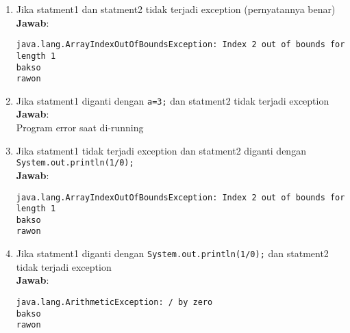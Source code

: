 \documentclass{article}
\newcommand{\jawab}{\textbf{Jawab}:}
\begin{document}
\begin{enumerate}
\begin{enumerate}[label=\alph*.]
      \item Jika statment1 dan statment2 tidak terjadi exception (pernyatannya benar)\\
      \jawab
      \begin{lstlisting}[frame=single]
java.lang.ArrayIndexOutOfBoundsException: Index 2 out of bounds for length 1
bakso
rawon
      \end{lstlisting}
      \item Jika statment1 diganti dengan \texttt{a=3;} dan statment2 tidak terjadi exception\\
      \jawab\\
      Program error saat di-running
      \item Jika statment1 tidak terjadi exception dan statment2 diganti dengan\\
      \texttt{System.out.println(1/0);}\\
      \jawab
      \begin{lstlisting}[frame=single]
java.lang.ArrayIndexOutOfBoundsException: Index 2 out of bounds for length 1
bakso
rawon
      \end{lstlisting}
      \item Jika statment1 diganti dengan \texttt{System.out.println(1/0);} dan statment2 tidak 
      terjadi exception\\
      \jawab
      \begin{lstlisting}[frame=single]
java.lang.ArithmeticException: / by zero
bakso
rawon
      \end{lstlisting}
    \end{enumerate}
  \end{enumerate}
\end{document}
